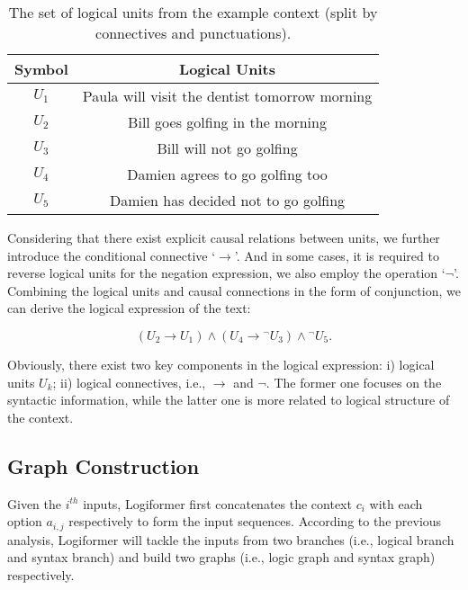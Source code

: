 \documentclass[sigconf]{acmart}
\begin{document}
\begin{table}[t]
	\centering
	\caption{The set of logical units from the example context (split by connectives and punctuations).}
	\vspace{-0.25cm}
	\begin{tabular}{cc}
		\toprule
		\textbf{Symbol} & \textbf{Logical Units} \\
		\hline
		$U_{1}$ & Paula will visit the dentist tomorrow morning\\
		$U_{2}$ & Bill goes golfing in the morning\\
		$U_{3}$ & Bill will not go golfing\\
		$U_{4}$ & Damien agrees to go golfing too\\
		$U_{5}$ & Damien has decided not to go golfing\\
		\bottomrule
	\end{tabular}
	\label{logical_units}
	\vspace{-0.4cm}
\end{table}

Considering that there exist explicit causal relations between units, we 
further introduce the conditional connective `$\to$'. And in some cases, it is 
required to reverse logical units for the negation expression, we also employ 
the operation `$\neg$'. Combining the logical units and causal connections in 
the form of conjunction, we can derive the logical expression of the text:

\vspace{-0.1cm}
\begin{equation}
	\left( {{U_2} \to {U_1}} \right) \wedge \left( {{U_4} \to {}^\neg {U_3}} \right) \wedge {}^\neg {U_5}.
\end{equation}

Obviously, there exist two key components in the logical expression: i) logical units $U_{k}$; ii) logical connectives, i.e., $\to$ and $\neg$. The former one focuses on the syntactic information, while the latter one is more related to logical structure of the context. 


\subsection{Graph Construction}
Given the $i^{th}$ inputs, Logiformer first concatenates the context $c_{i}$ with each option $a_{i,j}$ respectively to form the input sequences. According to the previous analysis, Logiformer will tackle the inputs from two branches (i.e., logical branch and syntax branch) and build two graphs (i.e., logic graph and syntax graph) respectively.
\end{document}
